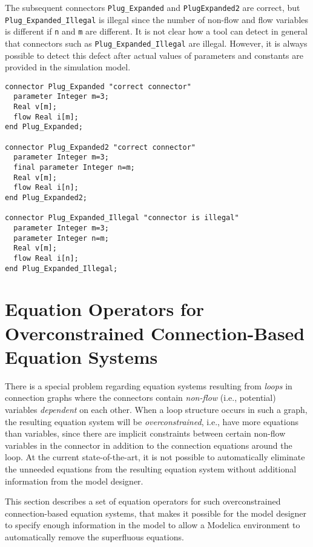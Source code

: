 \begin{example}
The subsequent connectors \lstinline!Plug_Expanded! and \lstinline!PlugExpanded2!
are correct, but \lstinline!Plug_Expanded_Illegal! is illegal since
the number of non-flow and flow variables is different if \lstinline!n! and \lstinline!m! are different. It is not clear how a tool can detect in
general that connectors such as \lstinline!Plug_Expanded_Illegal! are
illegal. However, it is always possible to detect this defect after
actual values of parameters and constants are provided in the simulation
model.

\begin{lstlisting}[language=modelica]
connector Plug_Expanded "correct connector"
  parameter Integer m=3;
  Real v[m];
  flow Real i[m];
end Plug_Expanded;

connector Plug_Expanded2 "correct connector"
  parameter Integer m=3;
  final parameter Integer n=m;
  Real v[m];
  flow Real i[n];
end Plug_Expanded2;

connector Plug_Expanded_Illegal "connector is illegal"
  parameter Integer m=3;
  parameter Integer n=m;
  Real v[m];
  flow Real i[n];
end Plug_Expanded_Illegal;
\end{lstlisting}
\end{example}

\section{Equation Operators for Overconstrained Connection-Based Equation Systems}\label{equation-operators-for-overconstrained-connection-based-equation-systems1}

There is a special problem regarding equation systems resulting from
\emph{loops} in connection graphs where the connectors contain
\emph{non-flow} (i.e., potential) variables \emph{dependent} on each
other. When a loop structure occurs in such a graph, the resulting
equation system will be \emph{overconstrained}, i.e., have more
equations than variables, since there are implicit constraints between
certain non-flow variables in the connector in addition to the
connection equations around the loop. At the current state-of-the-art,
it is not possible to automatically eliminate the unneeded equations
from the resulting equation system without additional information from
the model designer.

This section describes a set of equation operators for such
overconstrained connection-based equation systems, that makes it
possible for the model designer to specify enough information in the
model to allow a Modelica environment to automatically remove the
superfluous equations.

